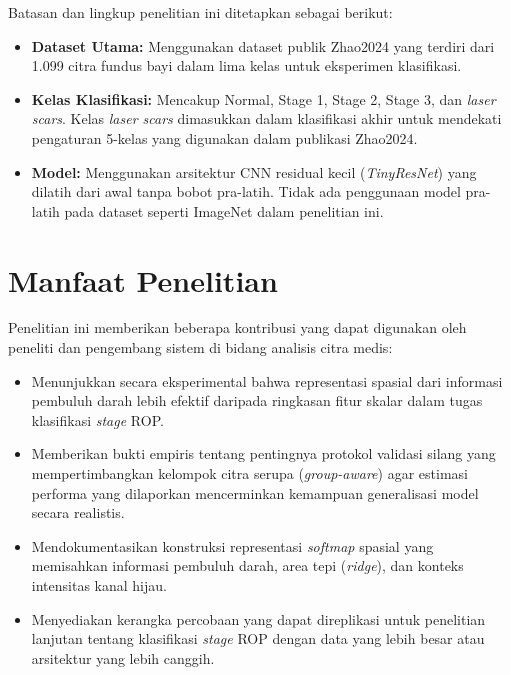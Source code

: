 Batasan dan lingkup penelitian ini ditetapkan sebagai berikut:

\begin{itemize}
    \item \textbf{Dataset Utama:} Menggunakan dataset publik Zhao2024 \citep{Zhao2024} yang
    terdiri dari 1.099 citra fundus bayi dalam lima kelas untuk eksperimen klasifikasi.
    \item \textbf{Kelas Klasifikasi:} Mencakup Normal, Stage 1, Stage 2, Stage 3, dan
    \textit{laser scars}. Kelas \textit{laser scars} dimasukkan dalam klasifikasi akhir
    untuk mendekati pengaturan 5-kelas yang digunakan dalam publikasi Zhao2024.
    \item \textbf{Model:} Menggunakan arsitektur CNN residual kecil (\textit{TinyResNet}) yang dilatih
    dari awal tanpa bobot pra-latih. Tidak ada penggunaan model pra-latih pada dataset
    seperti ImageNet dalam penelitian ini.
\end{itemize}

\section{Manfaat Penelitian}

Penelitian ini memberikan beberapa kontribusi yang dapat digunakan oleh peneliti dan
pengembang sistem di bidang analisis citra medis:

\begin{itemize}
    \item Menunjukkan secara eksperimental bahwa representasi spasial dari informasi pembuluh
    darah lebih efektif daripada ringkasan fitur skalar dalam tugas klasifikasi \textit{stage}
    ROP.
    \item Memberikan bukti empiris tentang pentingnya protokol validasi silang yang
    mempertimbangkan kelompok citra serupa (\textit{group-aware}) agar estimasi performa
    yang dilaporkan mencerminkan kemampuan generalisasi model secara realistis.
    \item Mendokumentasikan konstruksi representasi \textit{softmap} spasial yang memisahkan
    informasi pembuluh darah, area tepi (\textit{ridge}), dan konteks intensitas kanal hijau.
    \item Menyediakan kerangka percobaan yang dapat direplikasi untuk penelitian lanjutan
    tentang klasifikasi \textit{stage} ROP dengan data yang lebih besar atau arsitektur yang
    lebih canggih.
\end{itemize}
